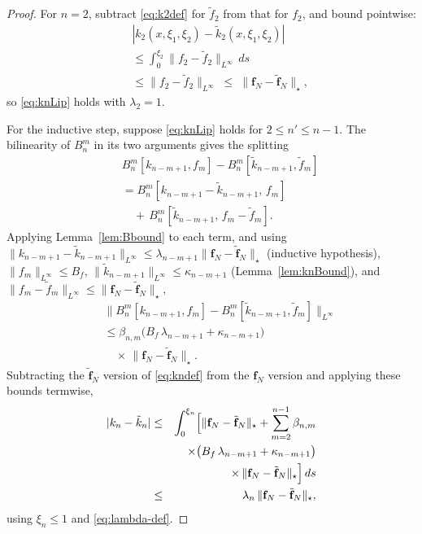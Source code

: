 \documentclass[twocolumn,amsthm]{autart}
\newcommand{\Linf}{L^\infty}
\theoremstyle{plain}
\theoremstyle{definition}
\begin{document}
\begin{proof}
For $n=2$, subtract \eqref{eq:k2def} for $\tilde f_2$ from that for $f_2$, and bound pointwise:
\begin{eqnarray}
&& |k_2(x,\xi_1,\xi_2) - \tilde k_2(x,\xi_1,\xi_2)| \nonumber \\
&& \le \int_0^{\xi_2} \|f_2 - \tilde f_2\|_{\Linf}\,ds \nonumber \\
&& \le \|f_2 - \tilde f_2\|_{\Linf}
\;\le\; \|\mathbf{f}_N-\tilde{\mathbf{f}}_N\|_\star,
\label{eq:k2diff-pw}
\end{eqnarray}
so \eqref{eq:knLip} holds with $\lambda_2 = 1$.

For the inductive step, suppose \eqref{eq:knLip} holds for $2\le n'\le n-1$. The bilinearity of $B_n^m$ in its two arguments gives the splitting
\begin{eqnarray}
&& B_n^m[k_{n-m+1},f_m] - B_n^m[\tilde k_{n-m+1},\tilde f_m] \nonumber \\
&& = B_n^m[k_{n-m+1}-\tilde k_{n-m+1},\,f_m] \nonumber \\
&& \quad +\, B_n^m[\tilde k_{n-m+1},\,f_m - \tilde f_m].
\label{eq:B-bilinear-split}
\end{eqnarray}
Applying Lemma~\ref{lem:Bbound} to each term, and using $\|k_{n-m+1}-\tilde k_{n-m+1}\|_{\Linf}\le \lambda_{n-m+1}\|\mathbf{f}_N-\tilde{\mathbf{f}}_N\|_\star$ (inductive hypothesis), $\|f_m\|_{\Linf}\le B_f$, $\|\tilde k_{n-m+1}\|_{\Linf}\le\kappa_{n-m+1}$ (Lemma~\ref{lem:knBound}), and $\|f_m-\tilde f_m\|_{\Linf}\le\|\mathbf{f}_N-\tilde{\mathbf{f}}_N\|_\star$,
\begin{eqnarray}
&& \|B_n^m[k_{n-m+1},f_m] - B_n^m[\tilde k_{n-m+1},\tilde f_m]\|_{\Linf} \nonumber \\
&& \le \beta_{n,m}\bigl(B_f\,\lambda_{n-m+1} + \kappa_{n-m+1}\bigr) \nonumber \\
&& \quad \times\, \|\mathbf{f}_N-\tilde{\mathbf{f}}_N\|_\star.
\label{eq:Bdiff-bnd}
\end{eqnarray}
Subtracting the $\tilde{\mathbf{f}}_N$ version of \eqref{eq:kndef} from the $\mathbf{f}_N$ version and applying these bounds termwise,
\begin{eqnarray}
|k_n - \tilde k_n| &\le& \int_0^{\xi_n}\Bigl[\|\mathbf{f}_N-\tilde{\mathbf{f}}_N\|_\star + \sum_{m=2}^{n-1} \beta_{n,m} \nonumber \\
&& \times\bigl(B_f\,\lambda_{n-m+1} + \kappa_{n-m+1}\bigr) \nonumber \\
&& \times\, \|\mathbf{f}_N-\tilde{\mathbf{f}}_N\|_\star\Bigr]\,ds \nonumber \\
&\le& \lambda_n\,\|\mathbf{f}_N-\tilde{\mathbf{f}}_N\|_\star,
\label{eq:kndiff-pw}
\end{eqnarray}
using $\xi_n\le 1$ and \eqref{eq:lambda-def}.
\end{proof}
\end{document}

